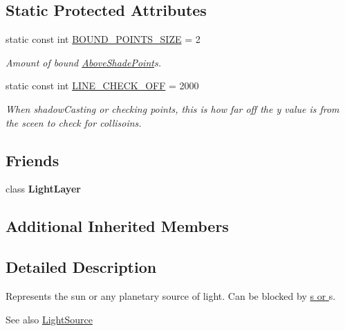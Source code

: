 \subsection*{Static Protected Attributes}
\begin{DoxyCompactItemize}
\item 
static const int \hyperlink{classlighting_1_1AboveLightSource_ac0d8f43e71b18876416b4091fb44bba6}{B\+O\+U\+N\+D\+\_\+\+P\+O\+I\+N\+T\+S\+\_\+\+S\+I\+ZE} = 2
\begin{DoxyCompactList}\small\item\em Amount of bound \hyperlink{classlighting_1_1AboveShadePoint}{Above\+Shade\+Point}s. \end{DoxyCompactList}\item 
static const int \hyperlink{classlighting_1_1AboveLightSource_a7f58e4685c32acd0c33f644b3578bcf4}{L\+I\+N\+E\+\_\+\+C\+H\+E\+C\+K\+\_\+\+O\+FF} = 2000
\begin{DoxyCompactList}\small\item\em When shadow\+Casting or checking points, this is how far off the y value is from the sceen to check for collisoins. \end{DoxyCompactList}\end{DoxyCompactItemize}
\subsection*{Friends}
\begin{DoxyCompactItemize}
\item 
class {\bfseries Light\+Layer}\hypertarget{classlighting_1_1AboveLightSource_aa4da5897890a726ecc5247c37419663b}{}\label{classlighting_1_1AboveLightSource_aa4da5897890a726ecc5247c37419663b}

\end{DoxyCompactItemize}
\subsection*{Additional Inherited Members}


\subsection{Detailed Description}
Represents the sun or any planetary source of light. Can be blocked by \hyperlink{classlighting_1_1AboveLightBlocker}{s or }s. 

\begin{DoxySeeAlso}{See also}
\hyperlink{classlighting_1_1LightSource}{Light\+Source}


\end{DoxySeeAlso}


